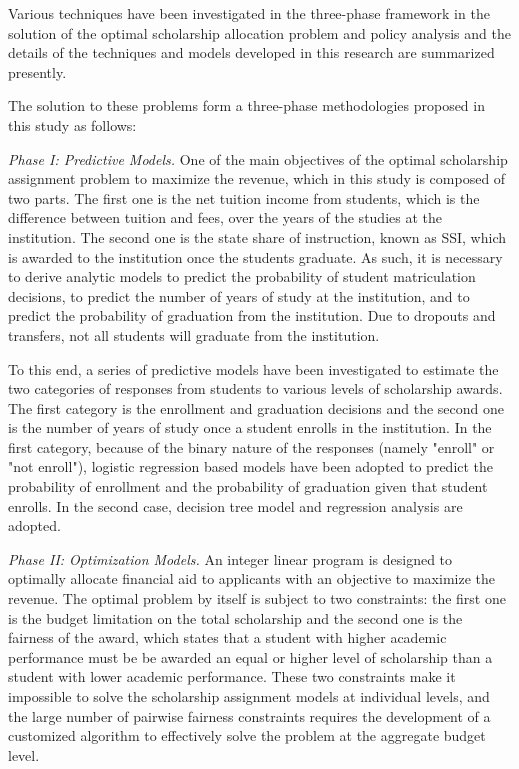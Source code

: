 \documentclass[12pt,english]{report}
\begin{document}
Various techniques have been investigated in the three-phase framework in the solution of the optimal scholarship allocation problem and policy analysis and the details of the techniques and models developed in this research are summarized presently.

The solution to these problems form a three-phase methodologies proposed in this study as follows:

\vspace*{.1in} 
\noindent \textit{Phase I: Predictive Models.} 
One of the main objectives of the optimal scholarship assignment problem to maximize the revenue, which in this study is composed of two parts. The first one is the net tuition income from students, which is the difference between tuition and fees, over the years of the studies at the institution. The second one is the state share of instruction, known as SSI, which is awarded to the institution once the students graduate.  As such,  it is necessary to derive analytic models to predict the probability of student matriculation decisions, to predict the number of years of study at the institution, and to predict the probability of graduation from the institution. Due to dropouts and transfers, not all students will graduate from the institution. 

To this end, a series of predictive models have been investigated to estimate the two categories of responses from students to various levels of scholarship awards. The first category is the enrollment and graduation decisions and the second one is the number of years of study once a student enrolls in the institution. In the first category, because of the binary nature of the responses (namely "enroll" or "not enroll"), logistic regression based models have been adopted to predict the probability of enrollment and the probability of graduation given that student enrolls. In the second case, decision tree model and regression analysis are adopted.


\noindent \textit{Phase II: Optimization Models.}  An integer linear program is designed to optimally allocate financial aid to applicants with an objective to maximize the revenue. The optimal problem by itself is subject to two constraints: the first one is the budget limitation on the total scholarship and the second one is the fairness of the award, which states that a student with higher academic performance must be be awarded an equal or higher level of scholarship than a student with lower academic performance. These two constraints make it impossible to solve the scholarship assignment models at individual levels, and the large number of pairwise fairness constraints requires the development of a customized algorithm to effectively solve the problem at the aggregate budget level.
\end{document}
